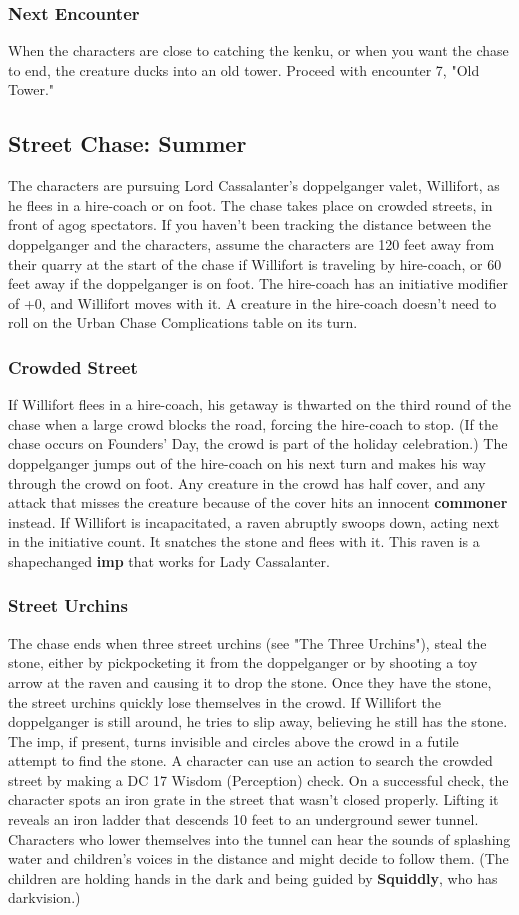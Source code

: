 \documentclass[10pt,a4paper,twoside,twocolumn,openany,nodeprecatedcode]{dndbook}
\begin{document}
\subsubsection{Next Encounter}
When the characters are close to catching the kenku, or when you want the chase to end, the creature ducks into an old tower. Proceed with encounter 7, "Old Tower."
\subsection{Street Chase: Summer}
The characters are pursuing Lord Cassalanter's doppelganger valet, Willifort, as he flees in a hire-coach or on foot. The chase takes place on crowded streets, in front of agog spectators.
If you haven't been tracking the distance between the doppelganger and the characters, assume the characters are 120 feet away from their quarry at the start of the chase if Willifort is traveling by hire-coach, or 60 feet away if the doppelganger is on foot. The hire-coach has an initiative modifier of +0, and Willifort moves with it. A creature in the hire-coach doesn't need to roll on the Urban Chase Complications table on its turn.
\subsubsection{Crowded Street}
If Willifort flees in a hire-coach, his getaway is thwarted on the third round of the chase when a large crowd blocks the road, forcing the hire-coach to stop. (If the chase occurs on Founders' Day, the crowd is part of the holiday celebration.) The doppelganger jumps out of the hire-coach on his next turn and makes his way through the crowd on foot.
Any creature in the crowd has half cover, and any attack that misses the creature because of the cover hits an innocent \textbf{commoner} instead.
If Willifort is incapacitated, a raven abruptly swoops down, acting next in the initiative count. It snatches the stone and flees with it. This raven is a shapechanged \textbf{imp} that works for Lady Cassalanter.
\subsubsection{Street Urchins}
The chase ends when three street urchins (see "The Three Urchins"), steal the stone, either by pickpocketing it from the doppelganger or by shooting a toy arrow at the raven and causing it to drop the stone. Once they have the stone, the street urchins quickly lose themselves in the crowd. If Willifort the doppelganger is still around, he tries to slip away, believing he still has the stone. The imp, if present, turns invisible and circles above the crowd in a futile attempt to find the stone.
A character can use an action to search the crowded street by making a DC 17 Wisdom (Perception) check. On a successful check, the character spots an iron grate in the street that wasn't closed properly. Lifting it reveals an iron ladder that descends 10 feet to an underground sewer tunnel. Characters who lower themselves into the tunnel can hear the sounds of splashing water and children's voices in the distance and might decide to follow them. (The children are holding hands in the dark and being guided by \textbf{Squiddly}, who has darkvision.)
\end{document}
